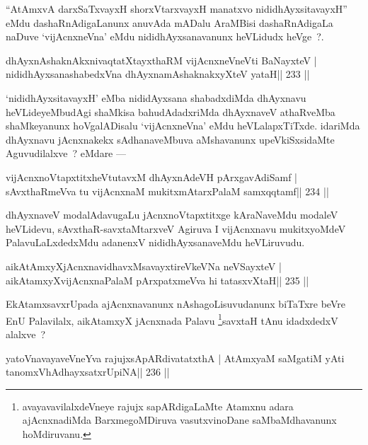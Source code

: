 \begin{artha}
``AtAmxvA darxSaTxvayxH shorxVtarxvayxH manatxvo nididhAyxsitavayxH'' eMdu dashaRnAdigaLanunx anuvAda mADalu AraMBisi dashaRnAdigaLa naDuve `vijAcnxneVna' eMdu nididhAyxsanavanunx heVLidudx heVge~?.
\end{artha}


\begin{shl}
dhAyxnAshaknAkxnivaqtatXtayxthaRM vijAcnxneVneVti BaNayxteV |
nididhAyxsanashabedxVna dhAyxnamAshaknakxyXteV yataH\hfill || 233 ||
\end{shl}

\begin{artha}
`nididhAyxsitavayxH' eMba nididAyxsana shabadxdiMda dhAyxnavu heVLideyeMbudAgi shaMkisa bahudAdadxriMda dhAyxnaveV athaRveMba shaMkeyanunx hoVgalADisalu `vijAcnxneVna' eMdu heVLalapxTiTxde. idariMda dhAyxnavu jAcnxnakekx sAdhanaveMbuva aMshavanunx upeVkiSxsidaMte Aguvudilalxve~? eMdare  {\rm ---} 
\end{artha}

\begin{shl}
vijAcnxnoVtapxtitxheVtutavxM dhAyxnAdeVH pArxgavAdiSamf |
sAvxthaRmeVva tu vijAcnxnaM mukitxmAtarxPalaM samxqqtamf\hfill || 234 ||
\end{shl}

\begin{artha}
dhAyxnaveV modalAdavugaLu jAcnxnoVtapxtitxge kAraNaveMdu modaleV heVLidevu, sAvxthaR-savxtaMtarxveV Agiruva I vijAcnxnavu mukitxyoMdeV PalavuLaLxdedxMdu adanenxV nididhAyxsanaveMdu heVLiruvudu.
\end{artha}


\begin{shl}
aikAtAmxyXjAcnxnavidhavxMsavayxtireVkeVNa neVSayxteV |
aikAtamxyXvijAcnxnaPalaM pArxpatxmeVva hi tatasxvXtaH\hfill || 235 ||
\end{shl}

\begin{artha}
EkAtamxsavxrUpada ajAcnxnavanunx nAshagoLisuvudanunx biTaTxre beVre EnU Palavilalx, aikAtamxyX jAcnxnada Palavu \footnote{avayavavilalxdeVneye rajujx sapARdigaLaMte Atamxnu adara ajAcnxnadiMda BarxmegoMDiruva vasutxvinoDane saMbaMdhavanunx hoMdiruvanu.}savxtaH tAnu idadxdedxV alalxve~?
\end{artha}

\begin{shl}
yatoV\s navayaveVneYva rajujxsApARdivatatxthA |
AtAmx\s yaM saMgatiM yAti tanomxVhAdhayxsatxrUpiNA\hfill || 236 ||
\end{shl}

